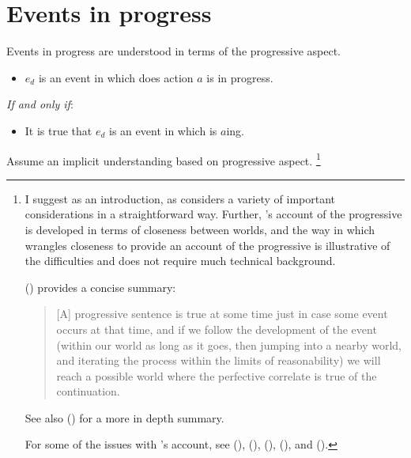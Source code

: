 \section{Events in progress}
\label{sec:events-progress}


\begin{note}
  Events in progress are understood in terms of the progressive aspect.

  \begin{definition}
    \vspace{-\baselineskip}
    \begin{itemize}
    \item
      \(e_{d}\) is an event in which \vAgent{} does action \(a\) is in progress.
    \end{itemize}
    \emph{If and only if}:
    \begin{itemize}
    \item
      It is true that \(e_{d}\) is an event in which \vAgent{} is \(a\)ing.
    \end{itemize}
    \vspace{-\baselineskip}
  \end{definition}

  \noindent%
  Assume an implicit understanding based on progressive aspect.%
  \footnote{
    \nocite{Portner:1998um}
    \nocite{Engelberg:1999vi}
    I suggest \textcite{Landman:1992wh} as an introduction, as \citeauthor{Landman:1992wh} considers a variety of important considerations in a straightforward way.
    Further, \citeauthor{Landman:1992wh}'s account of the progressive is developed in terms of closeness between worlds, and the way in which \citeauthor{Landman:1992wh} wrangles closeness to provide an account of the progressive is illustrative of the difficulties and does not require much technical background.

    \citeauthor{Szabo:2004ul} (\citeyear[34]{Szabo:2004ul}) provides a concise summary:
    \begin{quote}
      [A] progressive sentence is true at some time just in case some event occurs at that time, and if we follow the development of the event (within our world as long as it goes, then jumping into a nearby world, and iterating the process within the limits of reasonability) we will reach a possible world where the perfective correlate is true of the continuation.
    \end{quote}
    See also (\cite[764--766]{Portner:1998um}) for a more in depth summary.

    For some of the issues with \citeauthor{Landman:1992wh}'s account, see (\cite{Bonomi:1997uq}), (\cite[49--50]{Engelberg:1999vi}), (\cite[35]{Szabo:2004ul}), (\cite[767]{Portner:1998um}), and (\cite[esp.][1256]{Portner:2011vi}).
  }

\end{note}



